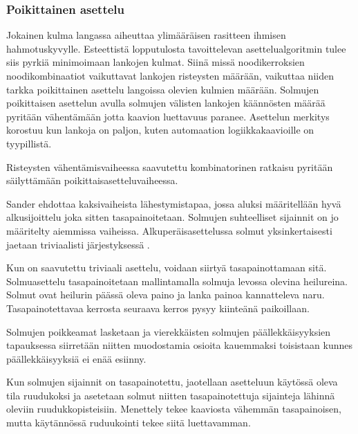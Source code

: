 \documentclass[finnish,12pt]{article}
\begin{document}

		\subsubsection{Poikittainen asettelu}

Jokainen kulma langassa aiheuttaa ylimääräisen rasitteen ihmisen hahmotuskyvylle. \cite{RefWorks:47}
Esteettistä lopputulosta tavoittelevan asettelualgoritmin tulee siis pyrkiä minimoimaan lankojen kulmat.
Siinä missä noodikerroksien noodikombinaatiot vaikuttavat lankojen risteysten määrään, vaikuttaa niiden tarkka poikittainen asettelu langoissa olevien kulmien määrään.
Solmujen poikittaisen asettelun avulla solmujen välisten lankojen käännösten määrää pyritään vähentämään jotta kaavion luettavuus paranee.
Asettelun merkitys korostuu kun lankoja on paljon, kuten automaation logiikkakaavioille on tyypillistä.

Risteysten vähentämisvaiheessa saavutettu kombinatorinen ratkaisu pyritään säilyttämään poikittaisasetteluvaiheessa.


\cite{RefWorks:49}

Sander ehdottaa kaksivaiheista lähestymistapaa, jossa aluksi määritellään hyvä alkusijoittelu joka sitten tasapainoitetaan.
Solmujen suhteelliset sijainnit on jo määritelty aiemmissa vaiheissa.
Alkuperäisasettelussa solmut yksinkertaisesti jaetaan triviaalisti järjestyksessä .

Kun on saavutettu triviaali asettelu, voidaan siirtyä tasapainottamaan sitä.
Solmuasettelu tasapainoitetaan mallintamalla solmuja levossa olevina heilureina.
Solmut ovat heilurin päässä oleva paino ja lanka painoa kannatteleva naru.
Tasapainotettavaa kerrosta seuraava kerros pysyy kiinteänä paikoillaan.

Solmujen poikkeamat lasketaan ja vierekkäisten solmujen päällekkäisyyksien tapauksessa siirretään niitten muodostamia osioita kauemmaksi toisistaan kunnes päällekkäisyyksiä ei enää esiinny.





Kun solmujen sijainnit on tasapainotettu, jaotellaan asetteluun käytössä oleva tila ruudukoksi ja asetetaan solmut niitten tasapainotettuja sijainteja lähinnä oleviin ruudukkopisteisiin.
Menettely tekee kaaviosta vähemmän tasapainoisen, mutta käytännössä ruduukointi tekee siitä luettavamman.
\end{document}
